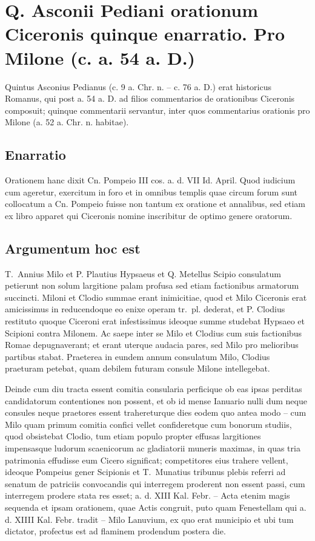 
\section*{Q. Asconii Pediani orationum Ciceronis quinque enarratio. Pro Milone (c. a. 54 a. D.)}

Quintus Asconius Pedianus (c. 9 a. Chr. n. – c. 76 a. D.) erat historicus Romanus, qui post a. 54 a. D. ad filios commentarios de orationibus Ciceronis composuit; quinque commentarii servantur, inter quos commentarius orationis pro Milone (a. 52 a. Chr. n. habitae).

\subsection*{Enarratio}


Orationem hanc dixit Cn. Pompeio III cos. a. d. VII Id. April. Quod iudicium cum ageretur, exercitum in foro et in omnibus templis quae circum forum sunt collocatum a Cn. Pompeio fuisse non tantum ex oratione et annalibus, sed etiam ex libro apparet qui Ciceronis nomine inscribitur de optimo genere oratorum.

\subsection*{Argumentum hoc est}

T.~Annius Milo et P. Plautius Hypsaeus et Q. Metellus Scipio consulatum petierunt non solum largitione palam profusa sed etiam factionibus armatorum succincti. Miloni et Clodio summae erant inimicitiae, quod et Milo Ciceronis erat amicissimus in reducendoque eo enixe operam tr.~pl. dederat, et P. Clodius restituto quoque Ciceroni erat infestissimus ideoque summe studebat Hypsaeo et Scipioni contra Milonem. Ac saepe inter se Milo et Clodius cum suis factionibus Romae depugnaverant; et erant uterque audacia pares, sed Milo pro melioribus partibus stabat. Praeterea in eundem annum consulatum Milo, Clodius praeturam petebat, quam debilem futuram consule Milone intellegebat. 

Deinde cum diu tracta essent comitia consularia perficique ob eas ipsas perditas candidatorum contentiones non possent, et ob id mense Ianuario nulli dum neque consules neque praetores essent trahereturque dies eodem quo antea modo – cum Milo quam primum comitia confici vellet confideretque cum bonorum studiis, quod obsistebat Clodio, tum etiam populo propter effusas largitiones impensasque ludorum scaenicorum ac gladiatorii muneris maximas, in quas tria patrimonia effudisse eum Cicero significat; competitores eius trahere vellent, ideoque Pompeius gener Scipionis et T.~Munatius tribunus plebis referri ad senatum de patriciis convocandis qui interregem proderent non essent passi, cum interregem prodere stata res esset; a. d. XIII Kal. Febr. – Acta etenim magis sequenda et ipsam orationem, quae Actis congruit, puto quam Fenestellam qui a. d. XIIII Kal. Febr. tradit – Milo Lanuvium, ex quo erat municipio et ubi tum dictator, profectus est ad flaminem prodendum postera die. 

